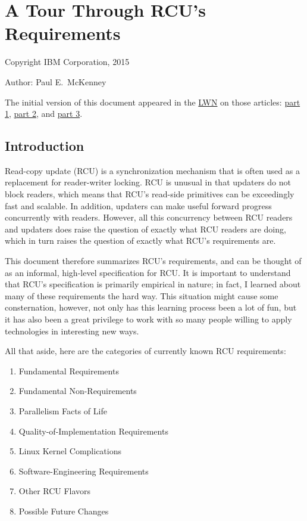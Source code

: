 \section{A Tour Through RCU's Requirements}
\label{sec:rcu:A Tour Through RCU's Requirements}

\begin{Note}
Copyright IBM Corporation, 2015

Author: Paul E. McKenney

The initial version of this document appeared in the
\href{https://lwn.net/}{LWN} on those articles:
\href{https://lwn.net/Articles/652156/}{part 1},
\href{https://lwn.net/Articles/652677/}{part 2}, and
\href{https://lwn.net/Articles/653326/}{part 3}.
\end{Note}


\subsection{Introduction}

Read-copy update (RCU) is a synchronization mechanism that is often used
as a replacement for reader-writer locking.
RCU is unusual in that
updaters do not block readers, which means that RCU's read-side
primitives can be exceedingly fast and scalable.
In addition, updaters
can make useful forward progress concurrently with readers.
However, all
this concurrency between RCU readers and updaters does raise the
question of exactly what RCU readers are doing, which in turn raises the
question of exactly what RCU's requirements are.

This document therefore summarizes RCU's requirements, and can be
thought of as an informal, high-level specification for RCU\@.
It is
important to understand that RCU's specification is primarily empirical
in nature; in fact, I learned about many of these requirements the hard
way.
This situation might cause some consternation, however, not only
has this learning process been a lot of fun, but it has also been a
great privilege to work with so many people willing to apply
technologies in interesting new ways.

All that aside, here are the categories of currently known RCU
requirements:

\begin{enumerate}
\item Fundamental Requirements
\item Fundamental Non-Requirements
\item Parallelism Facts of Life
\item Quality-of-Implementation Requirements
\item Linux Kernel Complications
\item Software-Engineering Requirements
\item Other RCU Flavors
\item Possible Future Changes
\end{enumerate}

